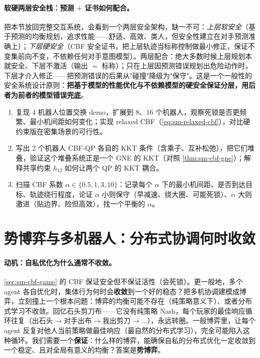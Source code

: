 \paragraph{软硬两层安全栈：预测 $+$ 证书如何配合。}
把本节放回完整交互系统，会看到一个两层安全架构，缺一不可：\emph{上层软安全}（基于预测的均衡规划，追求性能——舒适、高效、类人，但安全性建立在对手预测准确上）；\emph{下层硬安全}（CBF 安全证书，把上层轨迹当标称控制做最小修正，保证不变集前向不变，不依赖任何对手意图模型）。两层配合：绝大多数时候上层规划本就安全、下层不激活（输出 $=$ 标称）；只在上层因预测错误规划出危险动作时，下层才介入修正——把预测错误的后果从"碰撞"降级为"保守"。这是一个一般性的安全系统设计原则：\textbf{把基于模型的性能优化与不依赖模型的硬安全保证分层，用后者为前者的模型错误兜底}。

\begin{practice}
\begin{enumerate}
  \item 复现 4 机器人位置交换 demo，扩展到 8、16 个机器人，观察死锁是否更频繁、最小机间距如何变化；实现 relaxed CBF（\cref{eq:sm-relaxed-cbf}），对比硬约束版在密集场景的可行性。
  \item 写出 2 个机器人 CBF-QP 各自的 KKT 条件（含乘子、互补松弛），把它们堆叠，验证这个堆叠系统正是一个 GNE 的 KKT（对照 \cref{thm:sm-cbf-gne}）；解释共享约束 $h_{12}$ 如何让两个 QP 的 KKT 耦合。
  \item 扫描 CBF 系数 $\alpha\in\{0.5,1,3,10\}$：记录每个 $\alpha$ 下的最小机间距、是否到达目标、轨迹绕行程度，论证 $\alpha$ 小则保守（早减速、绕大圈、可能死锁）、$\alpha$ 大则激进（贴边界、险但高效），找一个平衡的 $\alpha$。
\end{enumerate}
\end{practice}

\section{势博弈与多机器人：分布式协调何时收敛}
\label{sec:sm-potential}

\paragraph{动机：自私优化为什么通常不收敛。}
\cref{sec:sm-cbf-game} 的 CBF 保证安全但不保证活性（会死锁）。更一般地，多个 agent 各自优化时，集体行为何时会\textbf{收敛}到一个好的稳态？把多机协调建模成博弈，立刻撞上一个根本问题：博弈的均衡可能不存在（纯策略意义下）、或者分布式学习不收敛。回忆石头剪刀布——它没有纯策略 Nash，每个玩家的最佳响应循环往复（出石头$\to$对手出布$\to$我出剪刀$\to\dots$），永远转圈。一般博弈里，让每个 agent 反复对他人当前策略做最佳响应（最自然的分布式学习），完全可能陷入这种循环。我们需要一个\textbf{保证}：什么样的博弈，能确保自私的分布式优化一定收敛到一个稳定、且对全局有意义的均衡？答案是\textbf{势博弈}。

